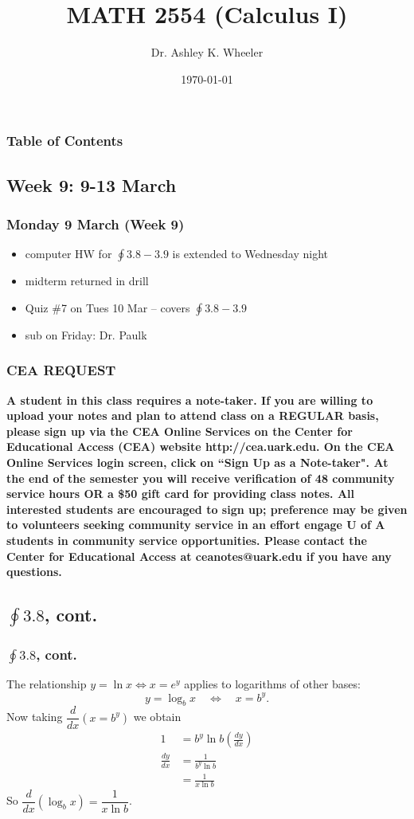 \documentclass[14pt]{beamer}
\title[Cal I S2015]{MATH 2554 (Calculus I)}
\subtitle{}
\author[Wheeler]{Dr. Ashley K. Wheeler}
\institute{University of Arkansas}
\date{\today}
\begin{document}
\maketitle

\begin{frame}
\frametitle{Table of Contents}
\tableofcontents
\end{frame}


\begin{frame}
\section[Week 9]{Week 9: 9-13 March}
\frametitle{Monday 9 March (Week 9)}
\small
\begin{itemize}
\item computer HW for $\oint 3.8-3.9$ is extended to Wednesday night
\item midterm returned in drill
\item Quiz \#7 on Tues 10 Mar -- covers $\oint 3.8-3.9$	
\item sub on Friday: Dr. Paulk
\end{itemize}
\end{frame}

\begin{frame}
\frametitle{CEA REQUEST}
\footnotesize {\bf
A student in this class requires a note-taker. If you are willing to upload your notes and plan to attend class on a REGULAR basis, please sign up via the CEA Online Services on the Center for Educational Access (CEA) website http://cea.uark.edu. On the CEA Online Services login screen, click on ``Sign Up as a Note-taker". At the end of the semester you will receive verification of 48 community service hours OR a \$50 gift card for providing class notes. All interested students are encouraged to sign up; preference may be given to volunteers seeking community service in an effort engage U of A students in community service opportunities. Please contact the Center for Educational Access at ceanotes@uark.edu if you have any questions.}
\end{frame}

\begin{frame}
\subsection[$\oint 3.8$, cont.]{$\oint 3.8$, cont.}
\frametitle{\small $\oint 3.8$, cont.}
\footnotesize
The relationship $y=\ln x \Longleftrightarrow x=e^y$ applies to logarithms of other bases:
\[y=\log_b x \quad\Longleftrightarrow\quad x=b^y.\]
Now taking $\dfrac{d}{dx}\left(x=b^y\right)$ we obtain
\vspace{-0.75pc}
\begin{align*}
1 &= b^y\ln b\left(\frac{dy}{dx}\right) \\
\frac{dy}{dx} &= \frac{1}{b^y \ln b} \\[0.5pc]
 &=\frac{1}{x \ln b}
\end{align*}
\bigskip
So \alert{$\dfrac{d}{dx}(\log_b x)=\dfrac{1}{x \ln b}$}.
\end{frame}
\end{document}
